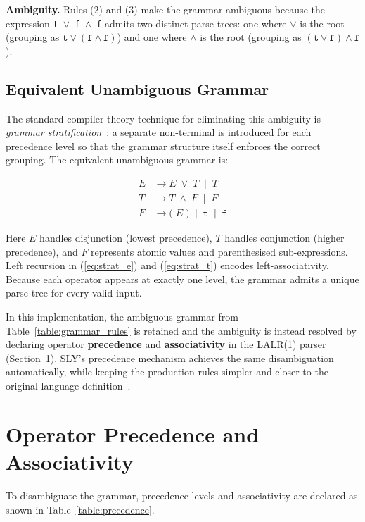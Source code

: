 \textbf{Ambiguity.} Rules (2) and (3) make the grammar ambiguous because the expression \texttt{t $\vee$ f $\wedge$ f} admits two distinct parse trees: one where $\vee$ is the root (grouping as $\texttt{t} \vee (\texttt{f} \wedge \texttt{f})$) and one where $\wedge$ is the root (grouping as $(\texttt{t} \vee \texttt{f}) \wedge \texttt{f}$).

\subsection{Equivalent Unambiguous Grammar}

The standard compiler-theory technique for eliminating this ambiguity is \emph{grammar stratification\/}~\citep{aho2006compilers}: a separate non-terminal is introduced for each precedence level so that the grammar structure itself enforces the correct grouping. The equivalent unambiguous grammar is:

\begin{align}
E &\rightarrow E \;\vee\; T \;\mid\; T \label{eq:strat_e}\\
T &\rightarrow T \;\wedge\; F \;\mid\; F \label{eq:strat_t}\\
F &\rightarrow \texttt{(}\; E \;\texttt{)} \;\mid\; \texttt{t} \;\mid\; \texttt{f} \label{eq:strat_f}
\end{align}

Here $E$ handles disjunction (lowest precedence), $T$ handles conjunction (higher precedence), and $F$ represents atomic values and parenthesised sub-expressions. Left recursion in (\ref{eq:strat_e}) and (\ref{eq:strat_t}) encodes left-associativity. Because each operator appears at exactly one level, the grammar admits a unique parse tree for every valid input.

In this implementation, the ambiguous grammar from Table~\ref{table:grammar_rules} is retained and the ambiguity is instead resolved by declaring operator \textbf{precedence} and \textbf{associativity} in the LALR(1) parser (Section~\ref{sec:precedence}). SLY's precedence mechanism achieves the same disambiguation automatically, while keeping the production rules simpler and closer to the original language definition~\citep{beazley2023sly}.

\section{Operator Precedence and Associativity}
\label{sec:precedence}

To disambiguate the grammar, precedence levels and associativity are declared as shown in Table~\ref{table:precedence}.

